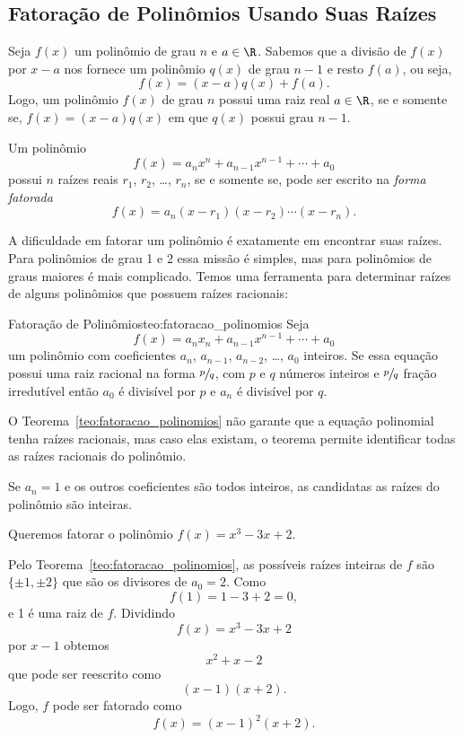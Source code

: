 \subsection{Fatoração de Polinômios Usando Suas Raízes}

Seja $f(x)$ um polinômio de grau $n$ e $a\in\R$.
Sabemos que a divisão de $f(x)$ por $x-a$ nos fornece um polinômio $q(x)$
de grau $n-1$ e resto $f(a)$, ou seja,
\[
  f(x) = (x-a)q(x) + f(a).
\]
Logo, um polinômio $f(x)$ de grau $n$ possui uma raiz real $a\in\R$,
se e somente se, $f(x)=(x-a)q(x)$ em que $q(x)$ possui grau $n-1$.

Um polinômio
\[
  f(x) = a_nx^n + a_{n-1}x^{n-1} + \cdots + a_0
\]
possui $n$ raízes reais $r_1$, $r_2$, \dots, $r_n$,
se e somente se, pode ser escrito na \emph{forma fatorada}
\[
  f(x) = a_n (x-r_1) (x-r_2) \cdots (x-r_n).
\]

A dificuldade em fatorar um polinômio é exatamente em encontrar suas raízes.
Para polinômios de grau 1 e 2 essa missão é simples, mas para polinômios
de graus maiores é mais complicado.
Temos uma ferramenta para determinar raízes de alguns polinômios
que possuem raízes racionais:

\begin{teorema}{Fatoração de Polinômios}{teo:fatoracao_polinomios}
  Seja
  \[
    f(x) = a_nx_n + a_{n-1}x^{n-1} + \cdots + a_0
  \]
  um polinômio com coeficientes
  $a_n$, $a_{n-1}$, $a_{n-2}$, \dots, $a_0$ inteiros.
  Se essa equação possui uma raiz racional na forma $\sfrac{p}{q}$,
  com $p$ e $q$ números inteiros e $\sfrac{p}{q}$ fração irredutível
  então $a_0$ é divisível por $p$ e $a_n$ é divisível por $q$.
\end{teorema}

O Teorema~\ref{teo:fatoracao_polinomios} não garante que a equação
polinomial tenha raízes racionais, mas caso elas existam,
o teorema permite identificar todas as raízes racionais do polinômio.

Se $a_n = 1$ e os outros coeficientes são todos inteiros, as
candidatas as raízes do polinômio são inteiras.

\begin{example}
  Queremos fatorar o polinômio $f(x)=x^3-3x+2$.

  \solution
  Pelo Teorema~\ref{teo:fatoracao_polinomios}, as
  possíveis raízes inteiras de $f$ são $\{\pm1, \pm2\}$
  que são os divisores de $a_0=2$.
  Como
  \[
    f(1) = 1 - 3 + 2 = 0,
  \]
  e 1 é uma raiz de $f$. Dividindo
  \[
    f(x) = x^3 - 3x + 2
  \]
  por $x-1$ obtemos
  \[
    x^2 + x - 2
  \]
  que pode ser reescrito como
  \[
    (x-1)(x+2).
  \]
  Logo, $f$ pode ser fatorado como
  \[
    f(x) = (x-1)^2(x+2).
  \]
\end{example}

